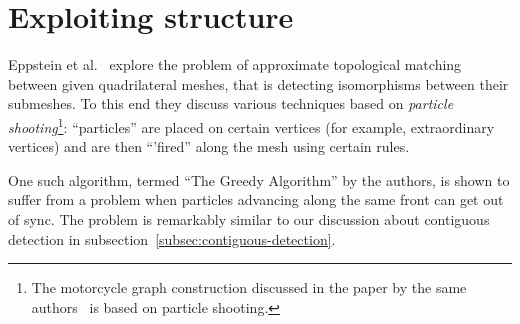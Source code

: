 









\section{Exploiting structure}




Eppstein et al.~\cite{eppstein2008approximate} explore the problem of approximate topological matching between given quadrilateral meshes, that is detecting isomorphisms between their submeshes. To this end they discuss various techniques based on \emph{particle shooting}\footnote{The motorcycle graph construction discussed in the paper by the same authors~\cite{eppstein2008motorcycle} is based on particle shooting.}: ``particles'' are placed on certain vertices (for example, extraordinary vertices) and are then ``'fired'' along the mesh using certain rules.

One such algorithm, termed ``The Greedy Algorithm'' by the authors, is shown to suffer from a problem when particles advancing along the same front can get out of sync. The problem is remarkably similar to our discussion about contiguous detection in subsection~\ref{subsec:contiguous-detection}.



